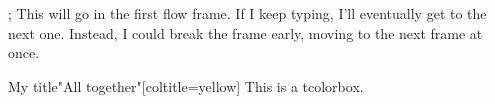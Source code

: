 \documentclass[a4paper]{article}
\begin{document}
;
\clearpage
This will go in the first flow frame.
If I keep typing, I'll eventually get to the next one.
Instead, I could\newpage
break the frame early, moving to the next frame at once.
\begin{mybox}[purple]{My title}"All together"[coltitle=yellow]
        This is a tcolorbox.
        \end{mybox}
  
\end{document}
